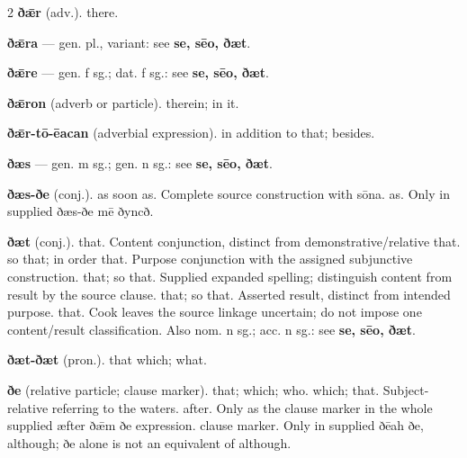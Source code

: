 \begin{multicols*}{2}
\textbf{ðǣr} (adv.). there.\par
\textbf{ðǣra} — gen. pl., variant: see \textbf{se, sēo, ðæt}.\par
\textbf{ðǣre} — gen. f sg.; dat. f sg.: see \textbf{se, sēo, ðæt}.\par
\textbf{ðǣron} (adverb or particle). therein; in it.\par
\textbf{ðǣr-tō-ēacan} (adverbial expression). in addition to that; besides.\par
\textbf{ðæs} — gen. m sg.; gen. n sg.: see \textbf{se, sēo, ðæt}.\par
\textbf{ðæs-ðe} (conj.). as soon as. Complete source construction with sōna. as. Only in supplied ðæs-ðe mē ðyncð.\par
\textbf{ðæt} (conj.). that. Content conjunction, distinct from demonstrative/relative that. so that; in order that. Purpose conjunction with the assigned subjunctive construction. that; so that. Supplied expanded spelling; distinguish content from result by the source clause. that; so that. Asserted result, distinct from intended purpose. that. Cook leaves the source linkage uncertain; do not impose one content/result classification. Also nom. n sg.; acc. n sg.: see \textbf{se, sēo, ðæt}.\par
\textbf{ðæt-ðæt} (pron.). that which; what.\par
\textbf{ðe} (relative particle; clause marker). that; which; who. which; that. Subject-relative referring to the waters. after. Only as the clause marker in the whole supplied æfter ðǣm ðe expression. clause marker. Only in supplied ðēah ðe, although; ðe alone is not an equivalent of although.\par

\end{multicols*}
